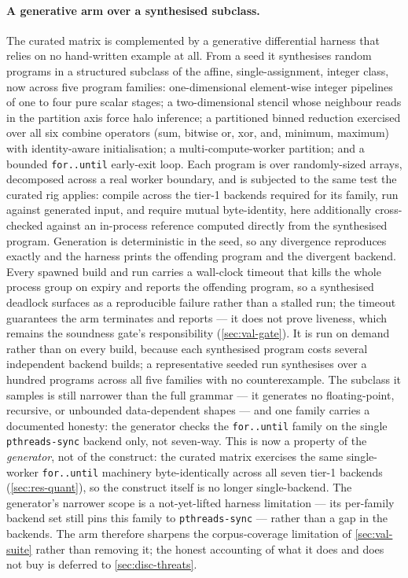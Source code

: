 \paragraph{A generative arm over a synthesised subclass.} The curated matrix is
complemented by a generative differential harness that relies on no hand-written
example at all. From a seed it synthesises random programs in a structured subclass
of the affine, single-assignment, integer class, now across five program families:
one-dimensional element-wise integer pipelines of one to four pure scalar stages; a
two-dimensional stencil whose neighbour reads in the partition axis force halo
inference; a partitioned binned reduction exercised over all six combine operators
(sum, bitwise or, xor, and, minimum, maximum) with identity-aware initialisation; a
multi-compute-worker partition; and a bounded \texttt{for..until} early-exit loop.
Each program is over randomly-sized arrays, decomposed across a real worker boundary,
and is subjected to the same test the curated rig applies: compile across the tier-1
backends required for its family, run against generated input, and require mutual
byte-identity, here additionally cross-checked against an in-process reference computed
directly from the synthesised program. Generation is deterministic in the seed, so any
divergence reproduces exactly and the harness prints the offending program and the
divergent backend. Every spawned build and run carries a wall-clock timeout that kills the
whole process group on expiry and reports the offending program, so a
synthesised deadlock surfaces as a reproducible failure rather than a
stalled run; the timeout guarantees the arm terminates and reports ---
it does not prove liveness, which remains the soundness gate's
responsibility (\cref{sec:val-gate}). It is run on demand
rather than on every build, because each synthesised program costs several independent
backend builds; a representative seeded run synthesises over a hundred programs across
all five families with no counterexample. The subclass it samples is still narrower
than the full grammar --- it generates no floating-point, recursive, or unbounded
data-dependent shapes --- and one family carries a documented honesty: the
generator checks the \texttt{for..until} family on the single \texttt{pthreads-sync}
backend only, not seven-way. This is now a property of the \emph{generator}, not of
the construct: the curated matrix exercises the same single-worker \texttt{for..until}
machinery byte-identically across all seven tier-1 backends (\cref{sec:res-quant}), so
the construct itself is no longer single-backend. The generator's narrower scope is a
not-yet-lifted harness limitation --- its per-family backend set still pins this family
to \texttt{pthreads-sync} --- rather than a gap in the backends.
The arm therefore sharpens the corpus-coverage limitation of \cref{sec:val-suite}
rather than removing it; the honest accounting of what it does and does not buy is
deferred to \cref{sec:disc-threats}.

